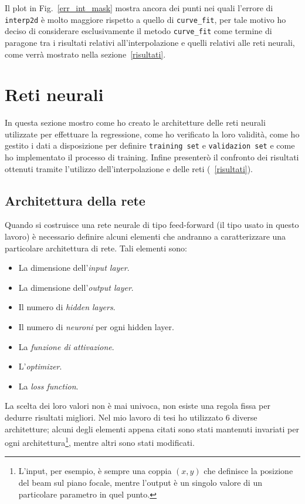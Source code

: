 \documentclass[12pt,a4paper,final]{book}
\begin{document}
Il plot in Fig.~\ref{err_int_mask} mostra ancora dei punti nei quali l'errore di \texttt{interp2d} è molto maggiore rispetto a quello di \texttt{curve\_fit}, per tale motivo ho deciso di considerare esclusivamente il metodo \texttt{curve\_fit} come termine di paragone tra i risultati relativi all'interpolazione e quelli relativi alle reti neurali, come verrà mostrato nella sezione~\ref{risultati}.

\newpage
\section{Reti neurali}\label{reti_neurali}
In questa sezione mostro come ho creato le architetture delle reti neurali utilizzate per effettuare la regressione, come ho verificato la loro validità, come ho gestito i dati a disposizione per definire \texttt{training set} e \texttt{validazion set} e come ho implementato il processo di training. Infine presenterò il confronto dei risultati ottenuti tramite l'utilizzo dell'interpolazione e delle reti (~\ref{risultati}).


\subsection{Architettura della rete}\label{architettura}
Quando si costruisce una rete neurale di tipo feed-forward (il tipo usato in questo lavoro) è necessario definire alcuni elementi che andranno a caratterizzare una particolare architettura di rete.
Tali elementi sono:
\begin{itemize}
	\item La dimensione dell'\textit{input layer}.
	\item La dimensione dell'\textit{output layer}.
	\item Il numero di \textit{hidden layers}.
	\item Il numero di \textit{neuroni} per ogni hidden layer.
	\item La \textit{funzione di attivazione}.
	\item L'\textit{optimizer}.
	\item La \textit{loss function}.
\end{itemize}
La scelta dei loro valori non è mai univoca, non esiste una regola fissa per dedurre risultati migliori.
Nel mio lavoro di tesi ho utilizzato 6 diverse architetture; alcuni degli elementi appena citati sono stati mantenuti invariati per ogni architettura\footnote{L'input, per esempio, è sempre una coppia $(x, y)$ che definisce la posizione del beam sul piano focale, mentre l'output è un singolo valore di un particolare parametro in quel punto.}, mentre altri sono stati modificati.
\end{document}

